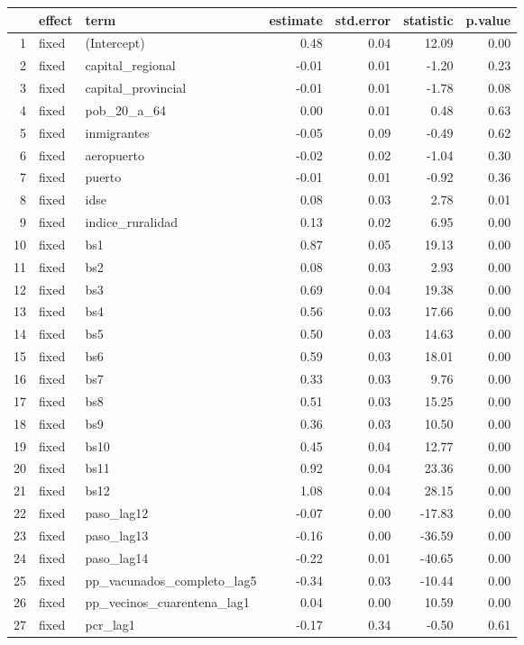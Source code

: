 \begin{table}[ht]
\centering
\begin{tabular}{rllrrrr}
  \hline
 & effect & term & estimate & std.error & statistic & p.value \\ 
  \hline
1 & fixed & (Intercept) & 0.48 & 0.04 & 12.09 & 0.00 \\ 
  2 & fixed & capital\_regional & -0.01 & 0.01 & -1.20 & 0.23 \\ 
  3 & fixed & capital\_provincial & -0.01 & 0.01 & -1.78 & 0.08 \\ 
  4 & fixed & pob\_20\_a\_64 & 0.00 & 0.01 & 0.48 & 0.63 \\ 
  5 & fixed & inmigrantes & -0.05 & 0.09 & -0.49 & 0.62 \\ 
  6 & fixed & aeropuerto & -0.02 & 0.02 & -1.04 & 0.30 \\ 
  7 & fixed & puerto & -0.01 & 0.01 & -0.92 & 0.36 \\ 
  8 & fixed & idse & 0.08 & 0.03 & 2.78 & 0.01 \\ 
  9 & fixed & indice\_ruralidad & 0.13 & 0.02 & 6.95 & 0.00 \\ 
  10 & fixed & bs1 & 0.87 & 0.05 & 19.13 & 0.00 \\ 
  11 & fixed & bs2 & 0.08 & 0.03 & 2.93 & 0.00 \\ 
  12 & fixed & bs3 & 0.69 & 0.04 & 19.38 & 0.00 \\ 
  13 & fixed & bs4 & 0.56 & 0.03 & 17.66 & 0.00 \\ 
  14 & fixed & bs5 & 0.50 & 0.03 & 14.63 & 0.00 \\ 
  15 & fixed & bs6 & 0.59 & 0.03 & 18.01 & 0.00 \\ 
  16 & fixed & bs7 & 0.33 & 0.03 & 9.76 & 0.00 \\ 
  17 & fixed & bs8 & 0.51 & 0.03 & 15.25 & 0.00 \\ 
  18 & fixed & bs9 & 0.36 & 0.03 & 10.50 & 0.00 \\ 
  19 & fixed & bs10 & 0.45 & 0.04 & 12.77 & 0.00 \\ 
  20 & fixed & bs11 & 0.92 & 0.04 & 23.36 & 0.00 \\ 
  21 & fixed & bs12 & 1.08 & 0.04 & 28.15 & 0.00 \\ 
  22 & fixed & paso\_lag12 & -0.07 & 0.00 & -17.83 & 0.00 \\ 
  23 & fixed & paso\_lag13 & -0.16 & 0.00 & -36.59 & 0.00 \\ 
  24 & fixed & paso\_lag14 & -0.22 & 0.01 & -40.65 & 0.00 \\ 
  25 & fixed & pp\_vacunados\_completo\_lag5 & -0.34 & 0.03 & -10.44 & 0.00 \\ 
  26 & fixed & pp\_vecinos\_cuarentena\_lag1 & 0.04 & 0.00 & 10.59 & 0.00 \\ 
  27 & fixed & pcr\_lag1 & -0.17 & 0.34 & -0.50 & 0.61 \\ 
   \hline
\end{tabular}
\end{table}
